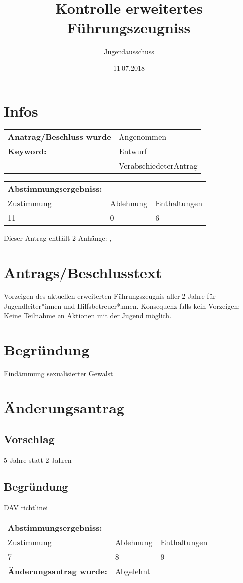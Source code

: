 \documentclass[12pt,a4paper]{scrartcl}
\begin{document}
\title{Kontrolle erweitertes Führungszeugniss}
\author{Jugendausschuss}
\date{11.07.2018}
\maketitle
\section{Infos}
\begin{tabularx}{\linewidth}{@{}lX}
\textbf{Anatrag/Beschluss wurde} & Angenommen\\
\textbf{Keyword:} & Entwurf\\
 & VerabschiedeterAntrag\\
\end{tabularx}
\begin{tabularx}{\linewidth}{@{}XXX}
\textbf{Abstimmungsergebniss:}&&\\
Zustimmung & Ablehnung & Enthaltungen \\
11 & 0 & 6 \\
\end{tabularx}\vspace{1.5ex} 
 Dieser Antrag enthält 2 Anhänge: ,  
\section{Antrags/Beschlusstext}
Vorzeigen des aktuellen erweiterten Führungszeugnis aller 2 Jahre für Jugendleiter*innen und Hilfsbetreuer*innen. Konsequenz falls kein Vorzeigen: Keine Teilnahme an Aktionen mit der Jugend möglich.
\section{Begründung}
Eindämmung sexualisierter Gewalst
\section{Änderungsantrag}
\subsection*{Vorschlag}
5 Jahre statt 2 Jahren
\subsection*{Begründung}
DAV richtlinei\vspace{1.5ex} \\
\begin{tabularx}{\linewidth}{@{}XXX}
\textbf{Abstimmungsergebniss:}&&\\
Zustimmung & Ablehnung & Enthaltungen \\
7 & 8 & 9 \\
\multicolumn{@{}2}{l}{\textbf{Änderungsantrag wurde:}} & Abgelehnt \\
\end{tabularx}
\appendix
\end{document}
